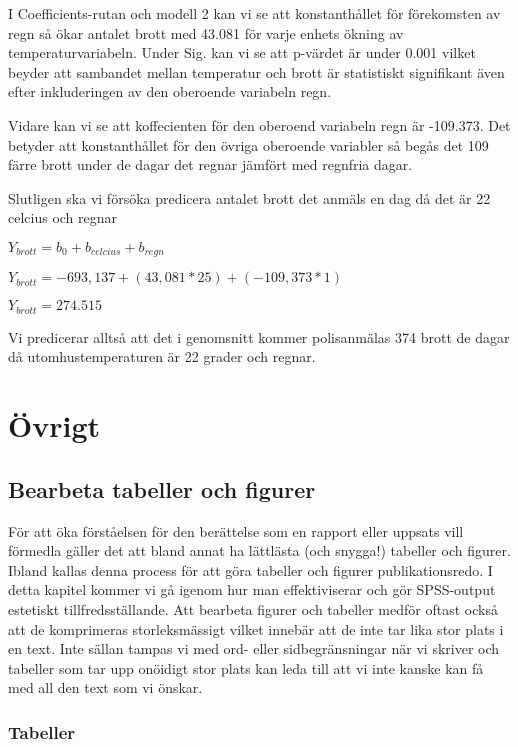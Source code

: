 \documentclass[
]{book}
\begin{document}
I Coefficients-rutan och modell 2 kan vi se att konstanthållet för förekomsten av regn så ökar antalet brott med 43.081 för varje enhets ökning av temperaturvariabeln. Under Sig. kan vi se att p-värdet är under 0.001 vilket beyder att sambandet mellan temperatur och brott är statistiskt signifikant även efter inkluderingen av den oberoende variabeln regn.

Vidare kan vi se att koffecienten för den oberoend variabeln regn är -109.373. Det betyder att konstanthållet för den övriga oberoende variabler så begås det 109 färre brott under de dagar det regnar jämfört med regnfria dagar.

Slutligen ska vi försöka predicera antalet brott det anmäls en dag då det är 22 celcius och regnar

\(Y_{brott} = b_0 + b_{celcius} + b_{regn}\)

\(Y_{brott} = -693,137 + (43,081*25) + (-109,373*1)\)

\(Y_{brott} = 274.515\)

Vi predicerar alltså att det i genomsnitt kommer polisanmälas 374 brott de dagar då utomhustemperaturen är 22 grader och regnar.

\hypertarget{part-uxf6vrigt}{%
\part*{Övrigt}\label{part-uxf6vrigt}}

\hypertarget{bearbeta-tabeller-och-figurer}{%
\chapter{Bearbeta tabeller och figurer}\label{bearbeta-tabeller-och-figurer}}

För att öka förståelsen för den berättelse som en rapport eller uppsats vill förmedla gäller det att bland annat ha lättlästa (och snygga!) tabeller och figurer. Ibland kallas denna process för att göra tabeller och figurer publikationsredo. I detta kapitel kommer vi gå igenom hur man effektiviserar och gör SPSS-output estetiskt tillfredsställande. Att bearbeta figurer och tabeller medför oftast också att de komprimeras storleksmässigt vilket innebär att de inte tar lika stor plats i en text. Inte sällan tampas vi med ord- eller sidbegränsningar när vi skriver och tabeller som tar upp onöidigt stor plats kan leda till att vi inte kanske kan få med all den text som vi önskar.

\hypertarget{tabeller}{%
\section{Tabeller}\label{tabeller}}
\end{document}
